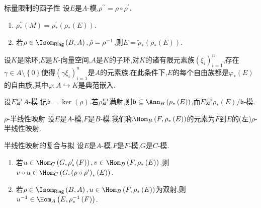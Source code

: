 \begin{proposition}{标量限制的函子性}{}
	设$E$是$A$-模,$\rho^{\prime\prime}=\rho\circ\rho^{\prime}$.
	\begin{enumerate}
		\item $\rho_{\ast}^{\prime\prime}\left(M\right)=\rho_{\ast}^{\prime}\left(\rho_{\ast}\left(E\right)\right)$.
		\item 若$\rho\in\Isom_{\mathsf{Ring}}\left(B,A\right),\tilde{\rho}=\rho^{-1}$,则$E=\tilde{\rho}_{\ast}\left(\rho_{\ast}\left(E\right)\right)$.
	\end{enumerate}
\end{proposition}

\begin{remark}{}{}
	设$K$是除环,$E$是$K$-向量空间,$A$是$K$的子环,对$K$的诸有限元素族$\left(\xi_{i}\right)_{i=1}^{n}$,存在$\gamma\in A\setminus\left\{0\right\}$使得$\left(\gamma\xi_{i}\right)_{i=1}^{n}$是$A$的元素族.在此条件下,$E$的每个自由族都是$\varphi_{\ast}\left(E\right)$的自由族,其中$\varphi:A\hookrightarrow K$是典范嵌入.
\end{remark}

\begin{remark}{}{}
	设$E$是$A$-模.记$\mathfrak{b}=\ker\left(\rho\right)$.若$\rho$是满射,则$\mathfrak{b}\subseteq\Ann_{B}\left(\rho_{\ast}\left(E\right)\right)$,而$E$是$\rho_{\ast}\left(E\right)/\mathfrak{b}$-模.
\end{remark}

\begin{definition}{$\rho$-半线性映射}{}
	设$E$是$A$-模,$F$是$B$-模.我们称$\Hom_{B}\left(F,\rho_{\ast}\left(E\right)\right)$的元素为$F$到$E$的(左)$\rho$-半线性映射.
\end{definition}

\begin{proposition}{半线性映射的复合与拟}{}
	设$E$是$A$-模,$F$是$F$-模,$G$是$C$-模.
	\begin{enumerate}
		\item 若$u\in\Hom_{C}\left(G,\rho_{\ast}^{\prime}\left(F\right)\right),v\in\Hom_{B}\left(F,\rho_{\ast}\left(E\right)\right)$,则$v\circ u\in\Hom_{C}\left(G,\left(\rho\circ\rho^{\prime}\right)_{\ast}\left(E\right)\right)$.
		\item 若$\rho\in\Isom_{\mathsf{Ring}}\left(B,A\right),u\in\Hom_{B}\left(F,\rho_{\ast}\left(E\right)\right)$为双射,则$u^{-1}\in\Hom_{A}\left(E,\rho_{\ast}^{-1}\left(F\right)\right)$.
	\end{enumerate}
\end{proposition}

